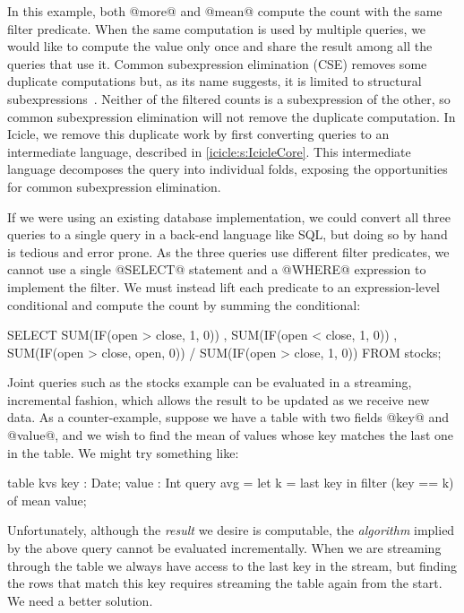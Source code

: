 In this example, both @more@ and @mean@ compute the count with the same filter predicate.
When the same computation is used by multiple queries, we would like to compute the value only once and share the result among all the queries that use it.
Common subexpression elimination (CSE) removes some duplicate computations but, as its name suggests, it is limited to structural subexpressions~\cite{chitil1997uncommon}.
Neither of the filtered counts is a subexpression of the other, so common subexpression elimination will not remove the duplicate computation.
In Icicle, we remove this duplicate work by first converting queries to an intermediate language, described in \cref{icicle:s:IcicleCore}.
This intermediate language decomposes the query into individual folds, exposing the opportunities for common subexpression elimination.

If we were using an existing database implementation, we could convert all three queries to a single query in a back-end language like SQL, but doing so by hand is tedious and error prone.
As the three queries use different filter predicates, we cannot use a single @SELECT@ statement and a @WHERE@ expression to implement the filter.
We must instead lift each predicate to an expression-level conditional and compute the count by summing the conditional:

\begin{sql}
  SELECT SUM(IF(open > close, 1,    0))
       , SUM(IF(open < close, 1,    0))
       , SUM(IF(open > close, open, 0))
       / SUM(IF(open > close, 1,    0))
  FROM stocks;
\end{sql}


Joint queries such as the stocks example can be evaluated in a streaming, incremental fashion, which allows the result to be updated as we receive new data.
As a counter-example, suppose we have a table with two fields @key@ and @value@, and we wish to find the mean of values whose key matches the last one in the table.
We might try something like:

\begin{icicle}
  table kvs { key : Date; value : Int }
  query avg = let k = last key
              in  filter (key == k) of mean value;
\end{icicle}

Unfortunately, although the \emph{result} we desire is computable, the \emph{algorithm} implied by the above query cannot be evaluated incrementally.
When we are streaming through the table we always have access to the last key in the stream, but finding the rows that match this key requires streaming the table again from the start.
We need a better solution.

